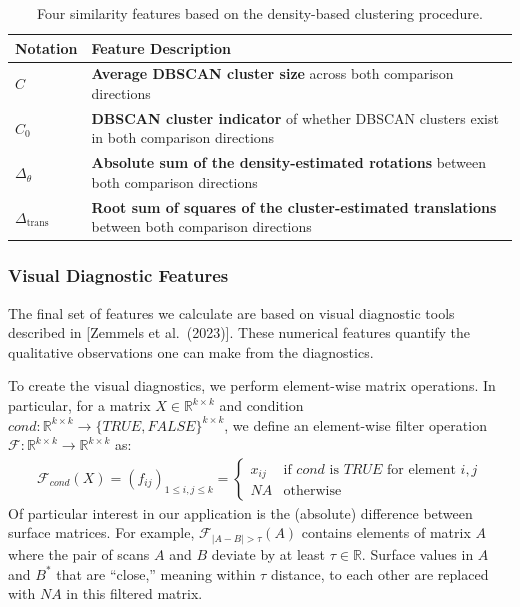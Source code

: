 \documentclass[
]{jdssv}
\begin{document}
\begin{table}[htbp]
\centering
\begin{tabular}{|p{.11\linewidth}|p{.7\linewidth}|}
\hline
Notation & Feature Description \\
\hline
$C$ & \textbf{Average DBSCAN cluster size} across both comparison directions \\
\hline
$C_0$ & \textbf{DBSCAN cluster indicator} of whether DBSCAN clusters exist in both comparison directions \\
\hline
$\Delta_\theta$ & \textbf{Absolute sum of the density-estimated rotations} between both comparison directions  \\
\hline
$\Delta_{\text{trans}}$ & \textbf{Root sum of squares of the cluster-estimated translations} between both comparison directions \\
\hline
\end{tabular}
\caption{Four similarity features based on the density-based clustering procedure.}
\label{tab:dbscanFeatures}
\end{table}

\hypertarget{visual-diagnostic-features}{%
\subsubsection{Visual Diagnostic
Features}\label{visual-diagnostic-features}}

The final set of features we calculate are based on visual diagnostic
tools described in {[}Zemmels et al.~(2023){]}. These numerical features
quantify the qualitative observations one can make from the diagnostics.

To create the visual diagnostics, we perform element-wise matrix
operations. In particular, for a matrix
\(X \in \mathbb{R}^{k \times k}\) and condition
\(cond: \mathbb{R}^{k \times k} \to \{TRUE,FALSE\}^{k \times k}\), we
define an element-wise filter operation
\(\mathcal{F}: \mathbb{R}^{k \times k} \to \mathbb{R}^{k \times k}\) as:
\begin{align*}
\mathcal{F}_{cond}(X) = 
(f_{ij})_{1 \leq i,j \leq k} =
\begin{cases}
x_{ij} &\text{if $cond$ is $TRUE$ for element $i,j$} \\
NA &\text{otherwise}
\end{cases}
\end{align*} Of particular interest in our application is the (absolute)
difference between surface matrices. For example,
\(\mathcal{F}_{|A - B| > \tau}(A)\) contains elements of matrix \(A\)
where the pair of scans \(A\) and \(B\) deviate by at least
\(\tau \in \mathbb{R}\). Surface values in \(A\) and \(B^*\) that are
``close,'' meaning within \(\tau\) distance, to each other are replaced
with \(NA\) in this filtered matrix.
\end{document}
